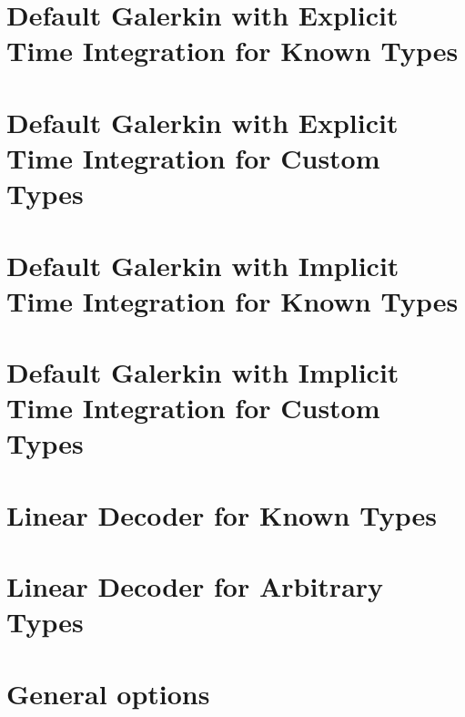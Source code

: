 \let\mypdfximage\pdfximage\def\pdfximage{\immediate\mypdfximage}\documentclass[twoside]{book}
\newcommand{\+}{\discretionary{\mbox{\scriptsize$\hookleftarrow$}}{}{}}
\begin{document}
\chapter{Default Galerkin with Explicit Time Integration for Known Types}
\label{md_pages_rom_galerkin_default_explicit}

\chapter{Default Galerkin with Explicit Time Integration for Custom Types}
\label{md_pages_rom_galerkin_default_explicit_custom_types}

\chapter{Default Galerkin with Implicit Time Integration for Known Types}
\label{md_pages_rom_galerkin_default_implicit}

\chapter{Default Galerkin with Implicit Time Integration for Custom Types}
\label{md_pages_rom_galerkin_default_implicit_custom_types}

\chapter{Linear Decoder for Known Types}
\label{md_pages_rom_tutorial_lin_dec}

\chapter{Linear Decoder for Arbitrary Types}
\label{md_pages_rom_tutorial_lin_dec_custom_types}

\chapter{General options}
\label{md_pages_solvers_nonlinear_tutorial_0}

\end{document}
